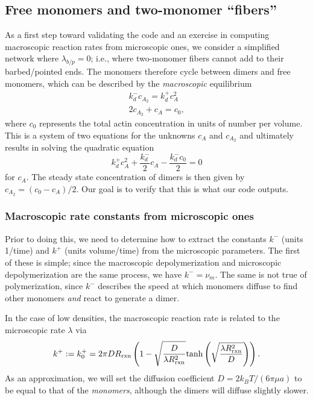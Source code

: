 \documentclass[11pt]{article}
\newcommand{\C}[1]{c_{#1}}
\begin{document}
\subsection{Free monomers and two-monomer ``fibers''}
As a first step toward validating the code and an exercise in computing macroscopic reaction rates from microscopic ones, we consider a simplified network where $\lambda_{b/p}=0$; i.e., where two-monomer fibers cannot add to their barbed/pointed ends. The monomers therefore cycle between dimers and free monomers, which can be described by the \emph{macroscopic} equilibrium
\begin{subequations}
\begin{gather}
k_d^- \C{A_2} = k_d^+ \C{A}^2 \\
2\C{A_2}+\C{A} = \C{0},
\end{gather}
\end{subequations}
where $\C{0}$ represents the total actin concentration in units of number per volume. This is a system of two equations for the unknowns $\C{A}$ and $\C{A_2}$ and ultimately results in solving the quadratic equation
\begin{equation}
\label{eq:quadA}
k_d^+ \C{A}^2 + \frac{k_d^-}{2} \C{A} - \frac{k_d^- \C{0}}{2} = 0
\end{equation}
for $\C{A}$. The steady state concentration of dimers is then given by $\C{A_2}=\left(\C{0}-\C{A}\right)/2$. Our goal is to verify that this is what our code outputs.

\subsubsection{Macroscopic rate constants from microscopic ones}
Prior to doing this, we need to determine how to extract the constants $k^-$ (units 1/time) and $k^+$ (units volume/time) from the microscopic parameters. The first of these is simple; since the macroscopic depolymerization and microscopic depolymerization are the same process, we have $k^-=\nu_m$. The same is not true of polymerization, since $k^-$ describes the speed at which monomers diffuse to find other monomers \emph{and} react to generate a dimer.

In the case of low densities, the macroscopic reaction rate is related to the microscopic rate $\lambda$ via \cite{erban2009stochastic}
\begin{equation}
\label{eq:erban}
k^+:=k^+_0 = 2 \pi D R_\text{rxn} \left(1-\sqrt{\frac{D}{\lambda R_\text{rxn}^2}} \text{tanh}\left(\sqrt{\frac{\lambda R_\text{rxn}^2}{D}}\right)\right).
\end{equation}
As an approximation, we will set the diffusion coefficient $D=2k_BT/(6 \pi \mu a)$ to be equal to that of the \emph{monomers}, although the dimers will diffuse slightly slower.
\end{document}
